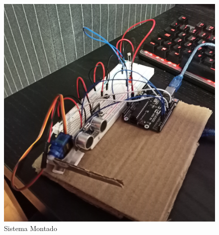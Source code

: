 \begin{figure}[H]
    \centering
    \includegraphics[scale=0.08]{images/hardware/sisAC_IRL.jpg}
    \caption{Sistema Montado}
\end{figure}